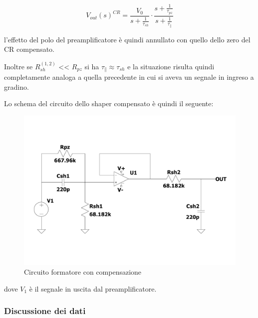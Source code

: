 \documentclass{article}
\begin{document}
\begin{equation}
    V_{out}(s)^{CR}=\frac{V_{0}}{s+\frac{1}{\tau_{sh}}}\cdot \frac{s+\frac{1}{\tau_{pz}}}{s+\frac{1}{\tau_{\parallel}}}    
\end{equation}

l’effetto del polo del preamplificatore è quindi annullato con quello dello zero del CR compensato.

Inoltre se $R_{sh}^{(1,2)}$ << $R_{pz}$ si ha $\tau_{\parallel} \approx \tau_{sh}$ e la situazione risulta quindi completamente 
analoga a quella precedente in cui si aveva un segnale in ingreso a gradino.

Lo schema del circuito dello shaper compensato è quindi il seguente:
 
\begin{center}
    \begin{figure}[H]
    \centering
    \includegraphics[scale=0.3, angle=0]{shapercomp.pdf}
    \caption{Circuito formatore con compensazione}
    \label{fig:shaper}
    \end{figure}
\end{center}
dove $V_1$ è il segnale in uscita dal preamplificatore.



\subsubsection{Discussione dei dati}
\end{document}
